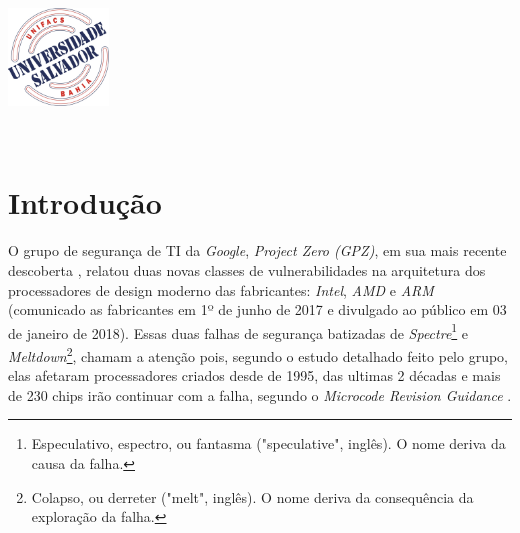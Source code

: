 \documentclass[
	12pt,				%
	openright,			%
	oneside,            %
	a4paper,			%
	chapter=TITLE,		%
	section=TITLE,		%
	subsection=TITLE,	%
	subsubsection=TITLE,%
	english,			%
	brazil,				%
]{abntex2}
\renewcommand{\imprimircapa}{%
\begin{capa}%
\begin{center}
\includegraphics[width=0.2\textwidth]{brasao.jpg}
\par
{\bfseries\large\imprimirinstituicao}
\end{center}
\vspace*{1cm}
\begin{center}
{\bfseries\large\MakeUppercase\imprimirautor}
\end{center}
\vfill
\begin{center}
\bfseries\Large\MakeUppercase\imprimirtitulo
\end{center}
\vfill
\begin{center}
\bfseries\large\imprimirlocal
\\
\bfseries\large\imprimirdata
\end{center}
\vspace*{1cm}
\end{capa}
}
\begin{document}

\frenchspacing 


\pretextual

\imprimircapa

\imprimirfolhaderosto

\tableofcontents*
\cleardoublepage


\textual

\pagestyle{emptystyle}

\chapter{Introdução}

O grupo de segurança de TI da \emph{Google}, \emph{Project Zero (GPZ)}, em sua mais recente descoberta \cite{googleprojectzero}, relatou duas novas classes de vulnerabilidades na arquitetura dos processadores de design moderno das fabricantes: \emph{Intel}, \emph{AMD} e \emph{ARM} (comunicado as fabricantes em 1º de junho de 2017 e divulgado ao público em 03 de janeiro de 2018). Essas duas falhas de segurança batizadas de \emph{Spectre}\footnote{Especulativo, espectro, ou fantasma ("speculative", inglês). O nome deriva da causa da falha.} e \emph{Meltdown}\footnote{Colapso, ou derreter ("melt", inglês). O nome deriva da consequência da exploração da falha.}, chamam a atenção pois, segundo o estudo detalhado feito pelo grupo, elas afetaram processadores criados desde de 1995, das ultimas 2 décadas e mais de 230 chips irão continuar com a falha, segundo o \emph{Microcode Revision Guidance} \cite{intel-mug}.
\end{document}
